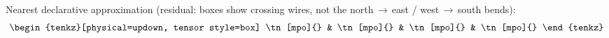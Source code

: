 \documentclass[varwidth=19cm, border=6pt]{standalone}
\begin{document}
Nearest declarative approximation (residual: boxes show crossing wires,
not the north\,$\to$\,east / west\,$\to$\,south bends):
\[
  \begin{tenkz}[physical=updown, tensor style=box]
    \tn[mpo]{} & \tn[mpo]{} & \tn[mpo]{} & \tn[mpo]{}
  \end{tenkz}
\]
\end{document}
